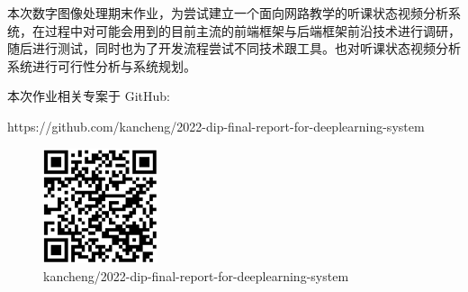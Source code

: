 \begin{cabstract}

本次数字图像处理期末作业，为尝试建立一个面向网路教学的听课状态视频分析系统，在过程中对可能会用到的目前主流的前端框架与后端框架前沿技术进行调研，随后进行测试，同时也为了开发流程尝试不同技术跟工具。也对听课状态视频分析系统进行可行性分析与系统规划。

本次作业相关专案于 GitHub:

https://github.com/kancheng/2022-dip-final-report-for-deeplearning-system

\begin{figure}[htb]
\centering 
\includegraphics[width=0.30\textwidth]{img/dip-final-qr.png} 
\caption{kancheng/2022-dip-final-report-for-deeplearning-system}
\label{Test}
\end{figure}



\end{cabstract}


